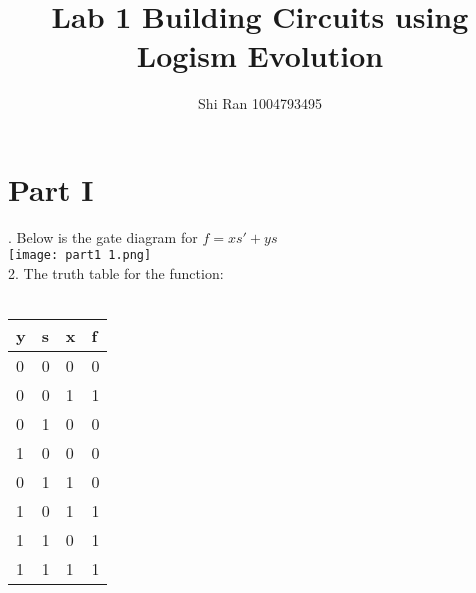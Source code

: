 \documentclass[12pt]{article}
\title{Lab 1 Building Circuits using Logism Evolution}
\author{Shi Ran 1004793495}
\begin{document}
	\maketitle
	\newpage
	\section*{Part I}. Below is the gate diagram for $f=xs'+ys$\\
	\texttt{[image: part1 1.png]}\\
	2. The truth table for the function: \\\\\hspace*{100pt}
	\begin{tabular}{|p{4em}|p{4em}|p{4em}|p{4em}|}\hline
		y & s & x & f \\\hline
		0 & 0 & 0 & 0 \\\hline
		0 & 0 & 1 & 1 \\\hline
		0 & 1 & 0 & 0 \\\hline
		1 & 0 & 0 & 0 \\\hline
		0 & 1 & 1 & 0 \\\hline
		1 & 0 & 1 & 1 \\\hline
		1 & 1 & 0 & 1 \\\hline
		1 & 1 & 1 & 1 \\\hline
	\end{tabular}
	\newpage
	
\end{document}
